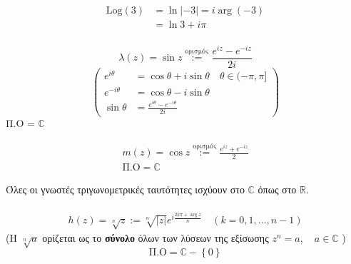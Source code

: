 \documentclass[12pt,a4paper,notitlepage,fleqn]{article}
\begin{document}
   \begin{align*}
   \mathrm{Log}(3) &= \ln|-3| = i\arg(-3) \\ &= \ln3+i\pi
   \end{align*}

    \paragraph{}
    \[
    \lambda(z) = \sin z \overset{\text{ορισμός}}{:=} \frac{e^{iz}-e^{-iz}}{2i}
    \]
    \[
    \left(
    \begin{array}{ll}
    e^{i\theta} &=\cos\theta+i\sin\theta  \quad \theta\in (-\pi,\pi] \\
    e^{-i\theta} &= \cos\theta -i\sin\theta \\[0.3pt] \hline
    \sin\theta &= \frac{e^{i\theta}-e^{-i\theta}}{2i}
    \end{array}
    \right)
    \]
    Π.Ο = \( \mathbb C \)

    \begin{gather*}
    m(z) = \cos z \overset{\text{ορισμός}}{:=} \frac{e^{iz}+e^{-iz}}{2} \\
    \text{Π.Ο} = \mathbb C
    \end{gather*}

    Όλες οι γνωστές τριγωνομετρικές ταυτότητες ισχύουν στο \( \mathbb C \)
    όπως στο \( \mathbb R  \).

    \paragraph{}
    \begin{align*}
    h(z) = \sqrt[n]{z} :=
    \sqrt[n]{|z|} e^{i\frac{2k\pi+\arg z}{n}} \quad (k=0,1,\dots,n-1)
    \end{align*}
    (Η \( \sqrt[n]{a} \) ορίζεται ως το \textbf{σύνολο} όλων των λύσεων
    της εξίσωσης \( z^n=a,\quad a\in\mathbb C \) )
    \[
    \text{Π.Ο} = \mathbb C - \left\lbrace 0 \right\rbrace
    \]
\end{document}
